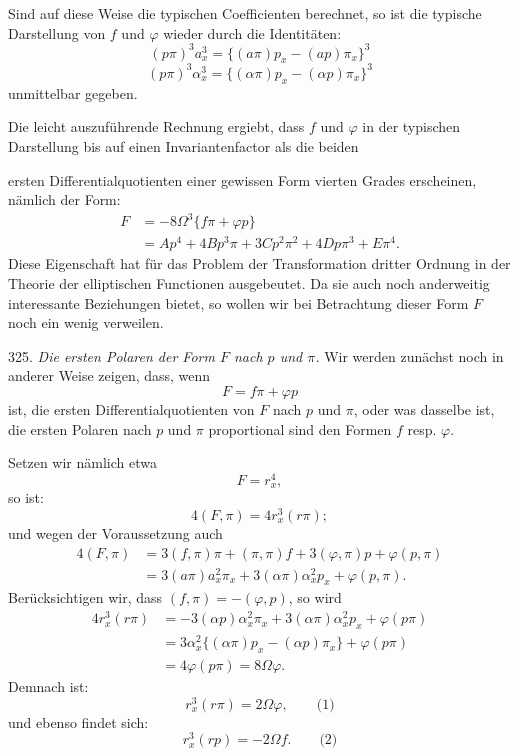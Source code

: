 \documentclass[11pt]{article}
\providecommand{\gesperrt}[1]{\textls[130]{#1}}
\providecommand{\weberpage}[1]{}
\let\Omega\varOmega
\begin{document}
Sind auf diese Weise die typischen Coefficienten berechnet, so ist die
typische Darstellung von $f$ und $\varphi$ wieder durch die
Identitäten:
\[
(p\pi)^3a_x^3=\{(a\pi)p_x-(ap)\pi_x\}^3
\]
\[
(p\pi)^3\alpha_x^3=\{(\alpha\pi)p_x-(\alpha p)\pi_x\}^3
\]
unmittelbar gegeben.

Die leicht auszuführende Rechnung ergiebt, dass $f$ und $\varphi$ in
der typischen Darstellung bis auf einen Invariantenfactor als die
beiden


\weberpage{348}

ersten Differentialquotienten einer gewissen Form vierten Grades
erscheinen, nämlich der Form:
\[
\begin{aligned}
F&=-8\Omega^3\{f\pi+\varphi p\}\\
&=Ap^4+4Bp^3\pi+3Cp^2\pi^2+4Dp\pi^3+E\pi^4.
\end{aligned}
\]
Diese Eigenschaft hat \gesperrt{Clebsch} für das Problem der
Transformation dritter Ordnung in der Theorie der elliptischen
Functionen ausgebeutet. Da sie auch noch anderweitig interessante
Beziehungen bietet, so wollen wir bei Betrachtung dieser Form $F$ noch
ein wenig verweilen.

325. \textit{Die ersten Polaren der Form $F$ nach $p$ und $\pi$.} Wir
werden zunächst noch in anderer Weise zeigen, dass, wenn
\[
F=f\pi+\varphi p
\]
ist, die ersten Differentialquotienten von $F$ nach $p$ und $\pi$,
oder was dasselbe ist, die ersten Polaren nach $p$ und $\pi$
proportional sind den Formen $f$ resp. $\varphi$.

Setzen wir nämlich etwa
\[
F=r_x^4,
\]
so ist:
\[
4(F,\pi)=4r_x^3(r\pi);
\]
und wegen der Voraussetzung auch
\[
\begin{aligned}
4(F,\pi)&=3(f,\pi)\pi+(\pi,\pi)f+3(\varphi,\pi)p+\varphi(p,\pi)\\
&=3(a\pi)a_x^2\pi_x+3(\alpha\pi)\alpha_x^2p_x+\varphi(p,\pi).
\end{aligned}
\]
Berücksichtigen wir, dass $(f,\pi)=-(\varphi,p)$, so wird
\[
\begin{aligned}
4r_x^3(r\pi)&=-3(\alpha p)\alpha_x^2\pi_x+3(\alpha\pi)\alpha_x^2p_x+\varphi(p\pi)\\
&=3\alpha_x^2\{(\alpha\pi)p_x-(\alpha p)\pi_x\}+\varphi(p\pi)\\
&=4\varphi(p\pi)=8\Omega\varphi.
\end{aligned}
\]
Demnach ist:
\[
r_x^3(r\pi)=2\Omega\varphi,\qquad\text{(1)}
\]
und ebenso findet sich:
\[
r_x^3(rp)=-2\Omega f.\qquad\text{(2)}
\]
\end{document}

